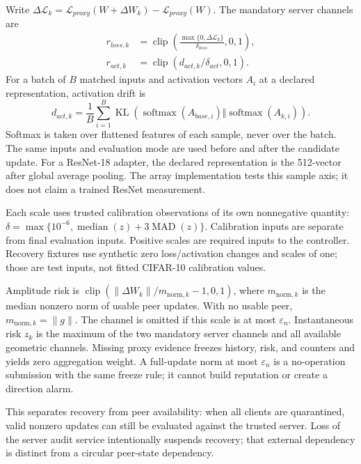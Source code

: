 \documentclass[conference,compsoc]{IEEEtran}
\begin{document}
Write $\Delta\mathcal L_k=\mathcal L_{proxy}(W+\Delta W_k)-
    \mathcal L_{proxy}(W)$. The mandatory server channels are
\begin{align}
    r_{loss,k} & =\operatorname{clip}\left(
    \frac{\max\{0,\Delta\mathcal L_k\}}
    {\delta_{loss}},0,1\right),                                    \\
    r_{act,k}  & =\operatorname{clip}(d_{act,k}/\delta_{act},0,1).
\end{align}
For a batch of $B$ matched inputs and activation vectors $A_i$ at a declared
representation, activation drift is
\begin{equation}
    d_{act,k}=\frac1B\sum_{i=1}^B
    \operatorname{KL}\!\left(\operatorname{softmax}(A_{base,i})
    \Vert\operatorname{softmax}(A_{k,i})\right).
\end{equation}
Softmax is taken over flattened features of each sample, never over the batch.
The same inputs and evaluation mode are used before and after the candidate
update. For a ResNet-18 adapter, the declared representation is the 512-vector
after global average pooling. The array implementation tests this sample axis;
it does not claim a trained ResNet measurement.

Each scale uses trusted calibration observations of its own nonnegative
quantity: $\delta=\max\{10^{-6},\operatorname{median}(z)+3\operatorname{MAD}(z)\}$.
Calibration inputs are separate from final evaluation inputs. Positive scales
are required inputs to the controller. Recovery fixtures use synthetic zero
loss/activation changes and scales of one; those are test inputs, not fitted
CIFAR-10 calibration values.

Amplitude risk is $\operatorname{clip}(\|\Delta W_k\|/m_{\mathrm{norm},k}-1,0,1)$, where
$m_{\mathrm{norm},k}$ is the median nonzero norm of usable peer updates. With no usable peer,
$m_{\mathrm{norm},k}=\|g\|$. The channel is omitted if this scale is at most $\varepsilon_n$.
Instantaneous risk $z_k$ is the maximum of the two mandatory server channels
and all available geometric channels. Missing proxy evidence freezes history,
risk, and counters and yields zero aggregation weight. A full-update norm at
most $\varepsilon_n$ is a no-operation submission with the same freeze rule;
it cannot build reputation or create a direction alarm.

This separates recovery from peer availability: when all clients are
quarantined, valid nonzero updates can still be evaluated against the trusted
server. Loss of the server audit service intentionally suspends recovery;
that external dependency is distinct from a circular peer-state dependency.
\end{document}
